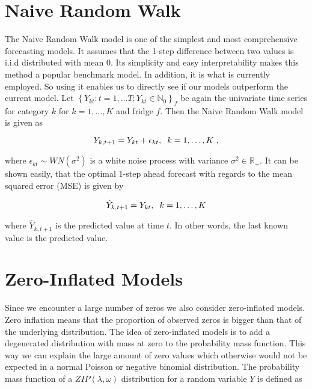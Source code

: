 
\section{Naive Random Walk}
\label{sec: Naive Random Walk}

The Naive Random Walk model is one of the simplest and most comprehensive forecasting models. It assumes that the 1-step difference between two values is i.i.d distributed with mean 0. Its simplicity and easy interpretability makes this method a popular benchmark model. In addition, it is what is currently employed. So using it enables us to directly see if our models outperform the current model. Let $\left\{Y_{kt}:t=1,\ldots T; Y_{kt} \in \mathbb{N}_0\right\}_f$ be again the univariate time series for category $k$ for $k=1,\ldots,K$ and fridge $f$. Then the Naive Random Walk model is given as

\begin{equation}
Y_{k,t+1}= Y_{kt} + \epsilon_{kt},\hspace{0.2cm} k=1,\ldots,K \hspace{0.1cm}, 
\label{eq: Random Walk Model}
\end{equation}
 
where $\epsilon_{kt} \sim WN(\sigma^2)$ is a white noise process with variance $\sigma^2 \in \mathbb{R}_+$. It can be shown easily, that the optimal 1-step ahead forecast with regards to the mean squared error (MSE) is given by

\begin{equation}
\hat{Y}_{k,t+1}= Y_{kt} ,\hspace{0.2cm} k=1,\ldots,K
\label{eq: Random Walk Model Prediction}
\end{equation}

where $\hat{Y}_{k,t+1}$ is the predicted value at time $t$. In other words, the last known value is the predicted value. 


\section{Zero-Inflated Models}
\label{sec: Zim}

Since we encounter a large number of zeros we also consider zero-inflated models. Zero inflation means that the proportion of observed zeros is bigger than that of the underlying distribution. The idea of zero-inflated models is to add a degenerated distribution with mass at zero to the probability mass function. This way we can explain the large amount of zero values which otherwise would not be expected in a normal Poisson or negative binomial distribution. The probability mass function of a $ZIP(\lambda,\omega)$ distribution for a random variable $Y$ is defined as \cite{Zhu:2012}

